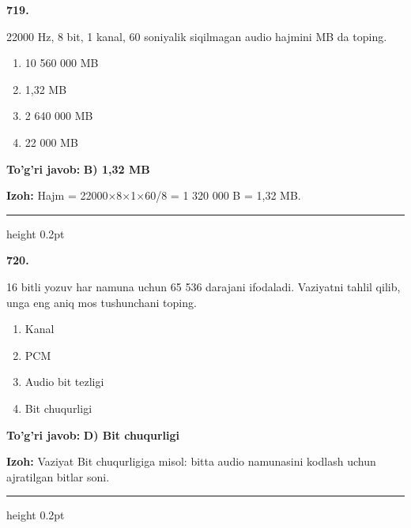 \documentclass[10pt,a4paper,oneside]{article}
\begin{document}
\noindent\textbf{\color{ink}719.}
\par
22000 Hz, 8 bit, 1 kanal, 60 soniyalik siqilmagan audio hajmini MB da toping.
\begin{enumerate}[label=\Alph*),leftmargin=9mm]
\item 10 560 000 MB
\item 1,32 MB
\item 2 640 000 MB
\item 22 000 MB
\end{enumerate}
\begin{tcolorbox}[enhanced,breakable,colback=teal!4,colframe=teal!50!black,boxrule=0.5pt,arc=1.1mm,left=3mm,right=3mm,top=1.7mm,bottom=1.7mm,before skip=2mm,after skip=2mm]
\textbf{\color{teal}To'g'ri javob:} \textbf{B) 1,32 MB}
\par\smallskip
\textbf{Izoh:} Hajm = 22000\ensuremath{\times}8\ensuremath{\times}1\ensuremath{\times}60/8 = 1 320 000 B = 1,32 MB.
\end{tcolorbox}
\vspace{2mm}\hrule height 0.2pt \vspace{3mm}

\noindent\textbf{\color{ink}720.}
\par
16 bitli yozuv har namuna uchun 65 536 darajani ifodaladi. Vaziyatni tahlil qilib, unga eng aniq mos tushunchani toping.
\begin{enumerate}[label=\Alph*),leftmargin=9mm]
\item Kanal
\item PCM
\item Audio bit tezligi
\item Bit chuqurligi
\end{enumerate}
\begin{tcolorbox}[enhanced,breakable,colback=teal!4,colframe=teal!50!black,boxrule=0.5pt,arc=1.1mm,left=3mm,right=3mm,top=1.7mm,bottom=1.7mm,before skip=2mm,after skip=2mm]
\textbf{\color{teal}To'g'ri javob:} \textbf{D) Bit chuqurligi}
\par\smallskip
\textbf{Izoh:} Vaziyat Bit chuqurligiga misol: bitta audio namunasini kodlash uchun ajratilgan bitlar soni.
\end{tcolorbox}
\vspace{2mm}\hrule height 0.2pt \vspace{3mm}
\end{document}
